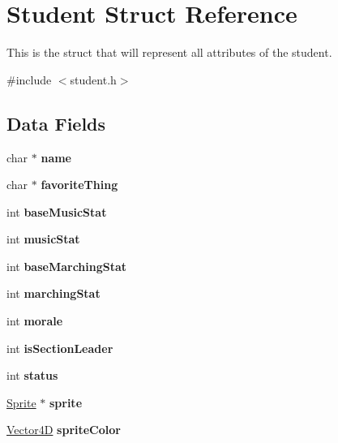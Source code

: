 \hypertarget{struct_student}{}\section{Student Struct Reference}
\label{struct_student}


This is the struct that will represent all attributes of the student.  




{\ttfamily \#include $<$student.\+h$>$}

\subsection*{Data Fields}
\begin{DoxyCompactItemize}
\item 
\mbox{\label{struct_student_a5ac083a645d964373f022d03df4849c8}} 
char $\ast$ {\bfseries name}
\item 
\mbox{\label{struct_student_afc5b1d340c71c05b606b922a2b771cf2}} 
char $\ast$ {\bfseries favorite\+Thing}
\item 
\mbox{\label{struct_student_a961dda4935fec71b930a5e890dfd800f}} 
int {\bfseries base\+Music\+Stat}
\item 
\mbox{\label{struct_student_a537b274a8e0eb482207a27efdbcdbee5}} 
int {\bfseries music\+Stat}
\item 
\mbox{\label{struct_student_af4ba11ccfbd6c945ffd3a0982d7c5d03}} 
int {\bfseries base\+Marching\+Stat}
\item 
\mbox{\label{struct_student_a1ffd9807649f3fadb5087c20438e9029}} 
int {\bfseries marching\+Stat}
\item 
\mbox{\label{struct_student_a41618f2cce097ee241597cae9276e1ec}} 
int {\bfseries morale}
\item 
\mbox{\label{struct_student_ac6afbba8552fa564e1dffd48731b7741}} 
int {\bfseries is\+Section\+Leader}
\item 
\mbox{\label{struct_student_a6e27f49150e9a14580fb313cc2777e00}} 
int {\bfseries status}
\item 
\mbox{\label{struct_student_a7c54302f990f134ca6e37a2e9ef9999d}} 
\hyperlink{struct_sprite___s}{Sprite} $\ast$ {\bfseries sprite}
\item 
\mbox{\label{struct_student_a34baf45a25100899cd17d061048d0ce5}} 
\hyperlink{struct_vector4_d}{Vector4D} {\bfseries sprite\+Color}
\end{DoxyCompactItemize}


